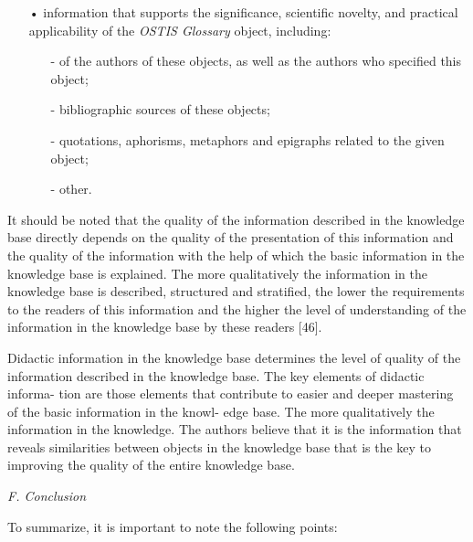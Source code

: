 \documentclass{article}
\begin{document}
\begin{multicols}{2}
\begin{itemize}

\item[•]information that supports the significance, scientific
novelty, and practical applicability of the \textit{OSTIS Glossary} object, including:
\begin{itemize}
\item[-]of the authors of these objects, as well as the
authors who specified this object;
\item[-]bibliographic sources of these objects;
\item[-]quotations, aphorisms, metaphors and epigraphs
related to the given object;
\item[-]other.

\end{itemize}
\end{itemize}

\quad
It should be noted that the quality of the information
described in the knowledge base directly depends on the
quality of the presentation of this information and the
quality of the information with the help of which the
basic information in the knowledge base is explained.
The more qualitatively the information in the knowledge
base is described, structured and stratified, the lower the
requirements to the readers of this information and the
higher the level of understanding of the information in
the knowledge base by these readers [46].

\quad
Didactic information in the knowledge base determines
the level of quality of the information described in the
knowledge base. The key elements of didactic informa-
tion are those elements that contribute to easier and
deeper mastering of the basic information in the knowl-
edge base. The more qualitatively the information in the knowledge. The authors believe that it is the information
that reveals similarities between objects in the knowledge
base that is the key to improving the quality of the entire
knowledge base.

\textit{F. Conclusion}

\quad
To summarize, it is important to note the following
points:

\begin{itemize}


\end{itemize}
\end{multicols}
\end{document}
